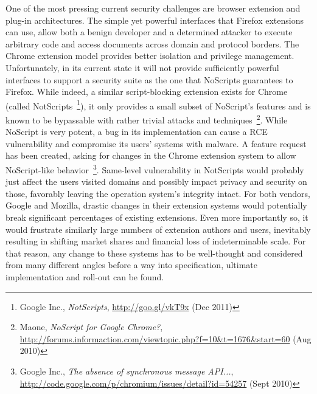     One of the most pressing current security challenges are browser extension and plug-in architectures. The simple yet powerful interfaces that Firefox extensions can use, allow both a benign developer and a determined attacker to execute arbitrary code and access documents across domain and protocol borders. The Chrome extension model provides better isolation and privilege management. Unfortunately, in its current state it will not provide sufficiently powerful interfaces to support a security suite as the one that NoScripts guarantees to Firefox. While indeed, a similar script-blocking extension exists for Chrome (called NotScripts~\footnote{Google Inc., \textit{NotScripts}, \url{http://goo.gl/vkT9x} (Dec 2011)}), it only provides a small subset of NoScript's features and is known to be bypassable with rather trivial attacks and techniques~\footnote{Maone, \textit{NoScript for Google Chrome?}, \url{http://forums.informaction.com/viewtopic.php?f=10&t=1676&start=60} (Aug 2010)}. While NoScript is very 
potent, a bug in its implementation can cause a RCE vulnerability and compromise its users' systems with malware. A feature request has been created, asking for changes in the Chrome extension system to allow NoScript-like behavior~\footnote{Google Inc., \textit{The absence of synchronous message API...}, \url{http://code.google.com/p/chromium/issues/detail?id=54257} (Sept 2010)}. Same-level vulnerability in NotScripts would probably just affect the users visited domains and possibly impact privacy and security on those, favorably leaving the operation system's integrity intact. For both vendors, Google and Mozilla, drastic changes in their extension systems would potentially break significant percentages of existing extensions. Even more importantly so, it would frustrate similarly large numbers of extension authors and users, inevitably resulting in shifting market shares and financial loss of indeterminable scale. For that reason, any change to these systems has to be well-thought and considered from many 
different angles before a way into specification, ultimate implementation and roll-out can be found.\\

